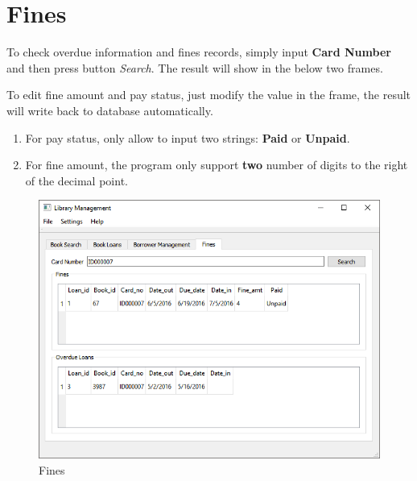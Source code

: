 \documentclass[a4paper, 12pt]{report}
\begin{document}
\pagebreak

\section*{Fines}
To check overdue information and fines records, simply input \textbf{Card Number} and then press button \textit{Search}. The result will show in the below two frames.

To edit fine amount and pay status, just modify the value in the frame, the result will write back to database automatically.

\begin{enumerate}
  \item For pay status, only allow to input two strings: \textbf{Paid} or \textbf{Unpaid}.
  \item For fine amount, the program only support \textbf{two} number of digits to the right of the decimal point.
\end{enumerate}

\begin{figure}[H]
  \includegraphics[width=\textwidth, inner]{./screenshot/fines.png}
  \caption{Fines}
\end{figure}
\end{document}
